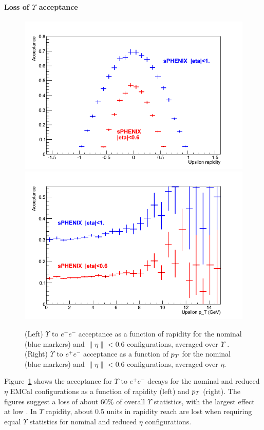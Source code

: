 \paragraph{Loss of $\Upsilon$ acceptance}
\begin{figure}[hbt]
  \centering
  \includegraphics[width=0.4\linewidth]{figs/upsilon_rate_y}
  \hspace{0.1\linewidth}
  \includegraphics[width=0.4\linewidth]{figs/upsilon_rate_pT}
  \caption{(Left)
  $\Upsilon$ to $e^+ e^-$ acceptance as a function of rapidity for the nominal (blue markers) and $\| \eta \| < 0.6$ configurations,
  averaged over $\Upsilon$ \pt. 
  (Right) $\Upsilon$ to $e^+ e^-$ acceptance as a function of $\mbox{${p_T}$}$ for the nominal (blue markers) and $\| \eta \| < 0.6$ 
  configurations, averaged over $\eta$.}
  \label{fig:upsilon_rate}
\end{figure}

Figure~\ref{fig:upsilon_rate} shows the acceptance for $\Upsilon$ to $e^+ e^-$ decays for the nominal and reduced $\eta$ EMCal
configurations as a function of rapidity (left) and $\mbox{${p_T}$}$ (right). The figures suggest a loss of about 60\% of overall 
$\Upsilon$ statistics, with the largest effect at low \pt. In $\Upsilon$ rapidity, about 0.5 units in rapidity reach are 
lost when requiring equal $\Upsilon$ statistics for nominal and reduced $\eta$ configurations.

